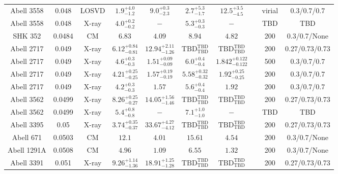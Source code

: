\begin{table}
\begin{tabular}{cccccccccc}
Abell 3558 & 0.048 & LOSVD & ${1.9}^{+4.0}_{-1.2}$ & ${9.0}^{+0.3}_{-2.3}$ & ${2.7}^{+5.3}_{-1.7}$ & ${12.5}^{+3.5}_{-4.5}$ & \citet{LO06.1} & virial & 0.3/0.7/0.7 \\
Abell 3558 & 0.048 & X-ray & ${4.0}^{+0.2}_{-0.2}$ & ${-}^{}_{}$ & ${5.3}^{+0.3}_{-0.3}$ & ${-}^{}_{}$ & \citet{XU01.1} & TBD & TBD \\
SHK 352 & 0.0484 & CM & ${6.83}^{}_{}$ & ${4.09}^{}_{}$ & ${8.94}^{}_{}$ & ${4.82}^{}_{}$ & \citet{RI06.1} & 200 & 0.3/0.7/None \\
Abell 2717 & 0.049 & X-ray & ${6.12}^{+0.84}_{-0.81}$ & ${12.94}^{+2.11}_{-1.26}$ & ${\mathrm{TBD}}^{\mathrm{TBD}}_{\mathrm{TBD}}$ & ${\mathrm{TBD}}^{\mathrm{TBD}}_{\mathrm{TBD}}$ & \citet{BA14.1} & 200 & 0.27/0.73/0.73 \\
Abell 2717 & 0.049 & X-ray & ${4.6}^{+0.3}_{-0.3}$ & ${1.51}^{+0.09}_{-0.09}$ & ${6.0}^{+0.4}_{-0.4}$ & ${1.842}^{+0.122}_{-0.122}$ & \citet{GA06.1} & 500 & 0.3/0.7/0.7 \\
Abell 2717 & 0.049 & X-ray & ${4.21}^{+0.25}_{-0.25}$ & ${1.57}^{+0.19}_{-0.19}$ & ${5.58}^{+0.32}_{-0.32}$ & ${1.92}^{+0.25}_{-0.25}$ & \citet{PO05.1} & 200 & 0.3/0.7/0.7 \\
Abell 2717 & 0.049 & X-ray & ${4.2}^{+0.3}_{-0.3}$ & ${1.57}^{}_{}$ & ${5.6}^{+0.4}_{-0.4}$ & ${1.92}^{}_{}$ & \citet{PR05.1} & 200 & 0.3/0.7/0.7 \\
Abell 3562 & 0.0499 & X-ray & ${8.26}^{+0.25}_{-0.27}$ & ${14.05}^{+1.56}_{-1.46}$ & ${\mathrm{TBD}}^{\mathrm{TBD}}_{\mathrm{TBD}}$ & ${\mathrm{TBD}}^{\mathrm{TBD}}_{\mathrm{TBD}}$ & \citet{BA14.1} & 200 & 0.27/0.73/0.73 \\
Abell 3562 & 0.0499 & X-ray & ${5.4}^{+0.8}_{-0.8}$ & ${-}^{}_{}$ & ${7.1}^{+1.0}_{-1.0}$ & ${-}^{}_{}$ & \citet{XU01.1} & TBD & TBD \\
Abell 3395 & 0.05 & X-ray & ${3.74}^{+0.35}_{-0.37}$ & ${33.67}^{+4.27}_{-4.12}$ & ${\mathrm{TBD}}^{\mathrm{TBD}}_{\mathrm{TBD}}$ & ${\mathrm{TBD}}^{\mathrm{TBD}}_{\mathrm{TBD}}$ & \citet{BA14.1} & 200 & 0.27/0.73/0.73 \\
Abell 671 & 0.0503 & CM & ${12.1}^{}_{}$ & ${4.01}^{}_{}$ & ${15.61}^{}_{}$ & ${4.54}^{}_{}$ & \citet{RI06.1} & 200 & 0.3/0.7/None \\
Abell 1291A & 0.0508 & CM & ${4.96}^{}_{}$ & ${1.09}^{}_{}$ & ${6.55}^{}_{}$ & ${1.32}^{}_{}$ & \citet{RI06.1} & 200 & 0.3/0.7/None \\
Abell 3391 & 0.051 & X-ray & ${9.26}^{+1.14}_{-1.36}$ & ${18.91}^{+1.25}_{-1.28}$ & ${\mathrm{TBD}}^{\mathrm{TBD}}_{\mathrm{TBD}}$ & ${\mathrm{TBD}}^{\mathrm{TBD}}_{\mathrm{TBD}}$ & \citet{BA14.1} & 200 & 0.27/0.73/0.73 \\

\end{tabular}
\end{table}
